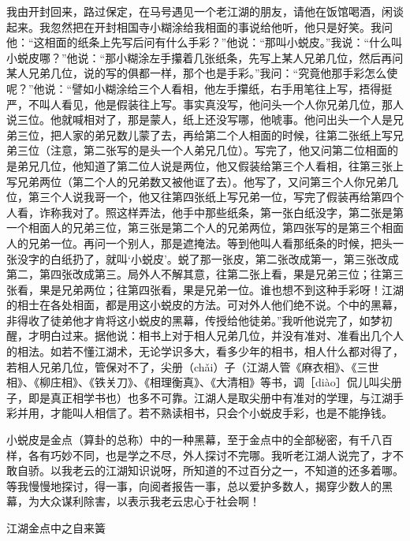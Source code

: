 \documentclass[12pt,UTF8]{ctexbook}
\begin{document}
我由开封回来，路过保定，在马号遇见一个老江湖的朋友，请他在饭馆喝酒，闲谈起来。我忽然把在开封相国寺小糊涂给我相面的事说给他听，他只是好笑。我问他：“这相面的纸条上先写后问有什么手彩？”他说：“那叫小蜕皮。”我说：“什么叫小蜕皮哪？”他说：“那小糊涂左手攥着几张纸条，先写上某人兄弟几位，然后再问某人兄弟几位，说的写的俱都一样，那个也是手彩。”我问：“究竟他那手彩怎么使呢？”他说：“譬如小糊涂给三个人看相，他左手攥纸，右手用笔往上写，捂得挺严，不叫人看见，他是假装往上写。事实真没写，他问头一个人你兄弟几位，那人说三位。他就喊相对了，那是蒙人，纸上还没写哪，他唬事。他问出头一个人是兄弟三位，把人家的弟兄数儿蒙了去，再给第二个人相面的时候，往第二张纸上写兄弟三位（注意，第二张写的是头一个人弟兄几位）。写完了，他又问第二位相面的是弟兄几位，他知道了第二位人说是两位，他又假装给第三个人看相，往第三张上写兄弟两位（第二个人的兄弟数又被他诓了去）。他写了，又问第三个人你兄弟几位，第三个人说我哥一个，他又往第四张纸上写兄弟一位，写完了假装再给第四个人看，诈称我对了。照这样弄法，他手中那些纸条，第一张白纸没字，第二张是第一个相面人的兄弟三位，第三张是第二个人的兄弟两位，第四张写的是第三个相面人的兄弟一位。再问一个别人，那是遮掩法。等到他叫人看那纸条的时候，把头一张没字的白纸扔了，就叫‘小蜕皮’。蜕了那一张皮，第二张改成第一，第三张改成第二，第四张改成第三。局外人不解其意，往第二张上看，果是兄弟三位；往第三张看，果是兄弟两位；往第四张看，果是兄弟一位。谁也想不到这种手彩呀！江湖的相士在各处相面，都是用这小蜕皮的方法。可对外人他们绝不说。个中的黑幕，非得收了徒弟他才肯将这小蜕皮的黑幕，传授给他徒弟。”我听他说完了，如梦初醒，才明白过来。据他说：相书上对于相人兄弟几位，并没有准对、准看出几个人的相法。如若不懂江湖术，无论学识多大，看多少年的相书，相人什么都对得了，若相人兄弟几位，管保对不了，尖册（chǎi）子（江湖人管《麻衣相》、《三世相》、《柳庄相》、《铁关刀》、《相理衡真》、《大清相》等书，调［diào］侃儿叫尖册子，即是真正相学书也）也多不可靠。江湖人是取尖册中有准对的学理，与江湖手彩并用，才能叫人相信了。若不熟读相书，只会个小蜕皮手彩，也是不能挣钱。

小蜕皮是金点（算卦的总称）中的一种黑幕，至于金点中的全部秘密，有千八百样，各有巧妙不同，也是学之不尽，外人探讨不完哪。我听老江湖人说完了，才不敢自骄。以我老云的江湖知识说呀，所知道的不过百分之一，不知道的还多着哪。等我慢慢地探讨，得一事，向阅者报告一事，总以爱护多数人，揭穿少数人的黑幕，为大众谋利除害，以表示我老云忠心于社会啊！





江湖金点中之自来簧
\end{document}
